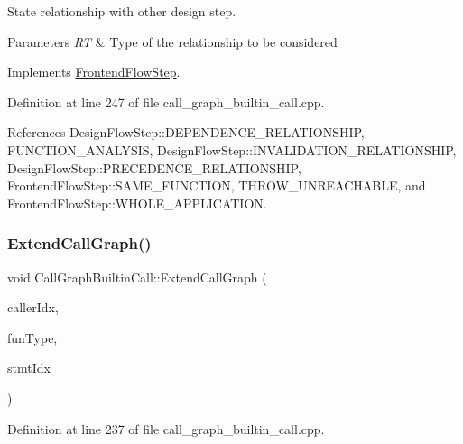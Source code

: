 State relationship with other design step. 


\begin{DoxyParams}{Parameters}
{\em RT} & Type of the relationship to be considered \\
\hline
\end{DoxyParams}


Implements \hyperlink{classFrontendFlowStep_abeaff70b59734e462d347ed343dd700d}{Frontend\+Flow\+Step}.



Definition at line 247 of file call\+\_\+graph\+\_\+builtin\+\_\+call.\+cpp.



References Design\+Flow\+Step\+::\+D\+E\+P\+E\+N\+D\+E\+N\+C\+E\+\_\+\+R\+E\+L\+A\+T\+I\+O\+N\+S\+H\+IP, F\+U\+N\+C\+T\+I\+O\+N\+\_\+\+A\+N\+A\+L\+Y\+S\+IS, Design\+Flow\+Step\+::\+I\+N\+V\+A\+L\+I\+D\+A\+T\+I\+O\+N\+\_\+\+R\+E\+L\+A\+T\+I\+O\+N\+S\+H\+IP, Design\+Flow\+Step\+::\+P\+R\+E\+C\+E\+D\+E\+N\+C\+E\+\_\+\+R\+E\+L\+A\+T\+I\+O\+N\+S\+H\+IP, Frontend\+Flow\+Step\+::\+S\+A\+M\+E\+\_\+\+F\+U\+N\+C\+T\+I\+ON, T\+H\+R\+O\+W\+\_\+\+U\+N\+R\+E\+A\+C\+H\+A\+B\+LE, and Frontend\+Flow\+Step\+::\+W\+H\+O\+L\+E\+\_\+\+A\+P\+P\+L\+I\+C\+A\+T\+I\+ON.

\mbox{\label{classCallGraphBuiltinCall_a454e14be35421e6dcc70c06ae958d588}} 
\subsubsection{\texorpdfstring{Extend\+Call\+Graph()}{ExtendCallGraph()}}
{\footnotesize\ttfamily void Call\+Graph\+Builtin\+Call\+::\+Extend\+Call\+Graph (\begin{DoxyParamCaption}\item[{unsigned int}]{caller\+Idx,  }\item[{\hyperlink{tree__node_8hpp_a6ee377554d1c4871ad66a337eaa67fd5}{tree\+\_\+node\+Ref}}]{fun\+Type,  }\item[{unsigned int}]{stmt\+Idx }\end{DoxyParamCaption})\hspace{0.3cm}{\ttfamily [private]}}



Definition at line 237 of file call\+\_\+graph\+\_\+builtin\+\_\+call.\+cpp.



